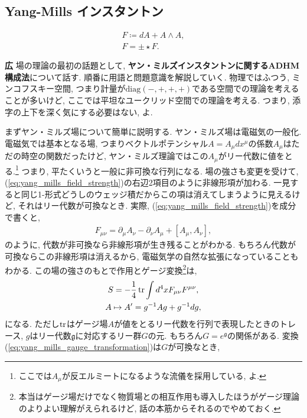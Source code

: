 \documentclass{ltjsarticle}
\theoremstyle{definition}
\newcommand{\parno}{\par\noindent}
\begin{document}
\subsection{Yang-Mills インスタントン
\label{subsection:yang_mills_instanton}}
\begin{tcolorbox}
  \begin{gather}
    F\coloneqq dA+A\wedge A,\label{eq:yang_mills_field_strength}\\
    F=\pm\star F.\label{eq:yang_mills_self_dual}
  \end{gather}
\end{tcolorbox}
\parno
\textbf{広} 場の理論の最初の話題として, \textbf{ヤン・ミルズインスタントンに関するADHM構成法}について話す. 順番に用語と問題意識を解説していく. 物理ではふつう, ミンコフスキー空間, つまり計量が$\mathrm{diag}(-,+,+,+)$である空間での理論を考えることが多いけど, ここでは平坦なユークリッド空間での理論を考える. つまり, 添字の上下を深く気にする必要はない, よ.\par
まずヤン・ミルズ場について簡単に説明する. ヤン・ミルズ場は電磁気の一般化. 電磁気では基本となる場, つまりベクトルポテンシャル$A=A_\mu dx^\mu$の係数$A_\mu$はただの時空の関数だったけど, ヤン・ミルズ理論ではこの$A_\mu$がリー代数に値をとる.\footnote{ここでは$A_\mu$が反エルミートになるような流儀を採用している, よ.} つまり, 平たくいうと一般に非可換な行列になる. 場の強さも変更を受けて, (\ref{eq:yang_mills_field_strength})の右辺2項目のように非線形項が加わる. 一見すると同じ1-形式どうしのウェッジ積だからこの項は消えてしまうように見えるけど, それはリー代数が可換なとき. 実際, (\ref{eq:yang_mills_field_strength})を成分で書くと,
\begin{gather}
  F_{\mu\nu}=\partial_\mu A_\nu-\partial_\nu A_\mu+[A_\mu,A_\nu],
\end{gather}
のように, 代数が非可換なら非線形項が生き残ることがわかる. もちろん代数が可換ならこの非線形項は消えるから, 電磁気学の自然な拡張になっていることもわかる. この場の強さのもとで作用とゲージ変換\footnote{本当はゲージ場だけでなく物質場との相互作用も導入したほうがゲージ理論のよりよい理解がえられるけど, 話の本筋からそれるのでやめておく.}は,
\begin{gather}
  S=-\frac14\tr\int d^4xF_{\mu\nu}F^{\mu\nu},\label{eq:yang_mills_action}\\
  A\mapsto A'=g^{-1}Ag+g^{-1}dg,\label{eq:yang_mills_gauge_transformation}
\end{gather}
になる. ただし$\tr$はゲージ場$A$が値をとるリー代数を行列で表現したときのトレース, $g$はリー代数$\mathfrak g$に対応するリー群$G$の元. もちろん$G=e^{\mathfrak g}$の関係がある. 変換(\ref{eq:yang_mills_gauge_transformation})は$G$が可換なとき,
\end{document}
